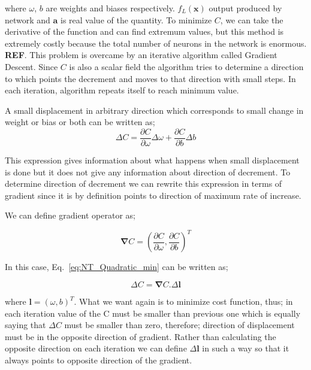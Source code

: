 \documentclass[a4paper,times,12pt]{article}
\begin{document}
where $\omega$, $b$ are weights and biases respectively. $f_L(\boldsymbol{x})$ output produced by network and $\boldsymbol{a}$ is real value of the quantity. To minimize $C$, we can take the derivative of the function and can find extremum values, but this method is extremely costly because the total number of neurons in the network is enormous. \textbf{REF}. This problem is overcame by an iterative algorithm called Gradient Descent. Since $C$ is also a scalar field the algorithm tries to determine a direction to which points the decrement and moves to that direction with small steps. In each iteration, algorithm repeats itself to reach minimum value. 

A small displacement in arbitrary direction which corresponds to small change in weight or bias or both can be written as;
\begin{equation}
\label{eq:NT_Quadratic_min}
\Delta{C} = \frac{\partial{C}}{\partial{\omega}}\Delta{\omega} + \frac{\partial{C}}{\partial{b}}\Delta{b}
\end{equation}

This expression gives information about what happens when small displacement is done but it does not give any information about direction of decrement. To determine direction of decrement we can rewrite this expression in terms of gradient since it is by definition points to direction of maximum rate of increase. 

We can define gradient operator as;

\begin{equation}
\label{eq:gradient}
\boldsymbol{\nabla}{C} = \left(\frac{\partial{C}}{\partial{\omega}},\frac{\partial{C}}{\partial{b}} \right)^T
\end{equation}

In this case, Eq.~\ref{eq:NT_Quadratic_min} can be written as;

\begin{equation}
\label{eq:NT_Quadratic_min_gradient_form}
\Delta{C} = \boldsymbol{\nabla}{C} \boldsymbol{.} \Delta \boldsymbol{l}
\end{equation}

where $\boldsymbol{l} = (\omega, b)^T$. What we want again is to minimize cost function, thus; in each iteration value of the C must be smaller than previous one which is equally saying that $\Delta{C}$ must be smaller than zero, therefore; direction of displacement must be in the opposite direction of gradient. Rather than calculating the opposite direction on each iteration we can define $\Delta{\boldsymbol{l}}$ in such a way so that it always points to opposite direction of the gradient.
\end{document}
